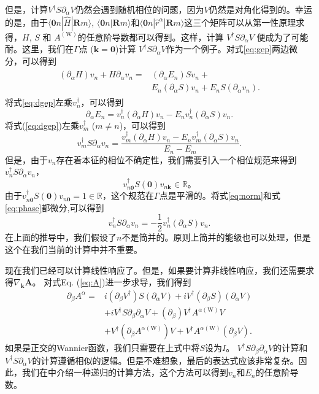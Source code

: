 但是，计算$V^{\dagger}S\partial_{\alpha}V$仍然会遇到随机相位的问题，因为$V$仍然是对角化得到的。幸运的是，由于$\langle\boldsymbol{0}n|\hat{H}|\boldsymbol{R}m\rangle$,
$\langle\boldsymbol{0}n|\boldsymbol{R}m\rangle$和$\langle\boldsymbol{0}n|\hat{r}^{\alpha}|\boldsymbol{R}m\rangle$这三个矩阵可以从第一性原理求得，$H$, $S$ 和 $A^{(\text{W})}$的任意阶导数都可以得到。这样，计算 $V^{\dagger}S\partial_{\alpha}V$ \cite{van2007computation}便成为了可能耐。这里，我们在$\Gamma$点 ($\boldsymbol{k}=\boldsymbol{0}$)计算
$V^{\dagger}S\partial_{\alpha}V$作为一个例子。对式\ref{eq:gep}两边微分，可以得到
\begin{align}
\begin{split}
(\partial_\alpha H)v_n+H\partial_\alpha v_n = & (\partial_\alpha E_n)Sv_n+\\
& E_n(\partial_\alpha S)v_n+E_n S(\partial_\alpha v_n).\label{eq:dgep}
\end{split}
\end{align}
将式\ref{eq:dgep}左乘$v_{n}^{\dagger}$，可以得到
\[
\partial_\alpha E_{n}=v_{n}^{\dagger}(\partial_\alpha H) v_{n}-E_{n}v_{n}^{\dagger}(\partial_\alpha S)v_{n}.
\]
将式(\ref{eq:dgep})左乘$v_{m}^{\dagger}$ ($m\ne n$)，可以得到
\[
v_{m}^{\dagger}S\partial_\alpha v_{n}=\frac{v_{m}^{\dagger}(\partial_\alpha H)v_{n}-E_{n}v_{m}^{\dagger}(\partial_\alpha S)v_{n}}{E_n-E_m}.
\]
但是，由于$v_{n}$存在着本征的相位不确定性，我们需要引入一个相位规范来得到$v_{n}^{\dagger}S \partial_\alpha v_{n}$，
\begin{equation}
v_{n\boldsymbol{0}}^{\dagger}S(\boldsymbol{0})v_{n\boldsymbol{k}}\in\mathbb{R}。\label{eq:phase}
\end{equation}
由于$v_{n\boldsymbol{0}}^{\dagger}S(\boldsymbol{0})v_{n\boldsymbol{0}}=1\in\mathbb{R}$，这个规范在$\Gamma$点是平滑的。将式\ref{eq:norm}和式\ref{eq:phase}都微分,可以得到
\[
v_{n}^{\dagger}S\partial_\alpha v_n=-\frac{1}{2}v_{n}^{\dagger}(\partial_\alpha S)v_n.
\]
在上面的推导中，我们假设了$n$不是简并的。原则上简并的能级也可以处理\cite{andrew1998computation}，但是这个在我们当前的计算中并不重要。

现在我们已经可以计算线性响应了。但是，如果要计算非线性响应，我们还需要求得$\nabla_{\boldsymbol{k}}\boldsymbol{A}$。 对式Eq. (\ref{eq:A})进一步求导，我们得到
\begin{equation}
\begin{split}
\partial_{\beta}A^{\alpha}  = &i(\partial_{\beta}V^{\dagger})S(\partial_{\alpha}V)+iV^{\dagger}(\partial_{\beta}S)(\partial_{\alpha}V)\\
&+iV^{\dagger}S\partial_{\beta}\partial_{\alpha}V+(\partial_{\beta})V^{\dagger}A^{\alpha(\text{W})}V\\
&+V^{\dagger}(\partial_{\beta}A^{\alpha(\text{W})})V+V^{\dagger}A^{\alpha(\text{W})}(\partial_{\beta}V).
\end{split}
\end{equation}
如果是正交的Wannier函数\cite{wang_first-principles_2017}，我们只需要在上式中将$S$设为$I$。 $V^{\dagger}S\partial_{\beta}\partial_{\alpha}V$的计算和$V^{\dagger}S\partial_{\alpha}V$的计算遵循相似的逻辑。但是不难想象，最后的表达式应该非常复杂。因此，我们在中介绍一种递归的计算方法，这个方法可以得到$v_n$和$E_{n}$的任意阶导数。


